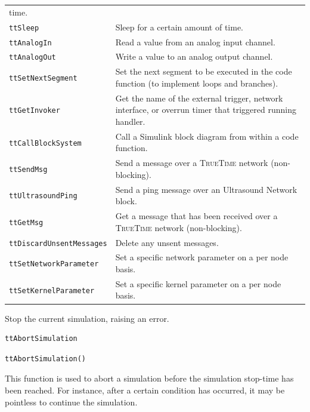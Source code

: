 \documentclass[final,twoside]{rapport}
\begin{document}
\begin{table}[htbp]
\begin{center}
\begin{tabularx}{\hsize}{|l|>{\raggedright\arraybackslash}X|}
time. \\
{\tt ttSleep} & Sleep for a certain amount of time. \\ 
{\tt ttAnalogIn} & Read a value from an analog input channel. \\
{\tt ttAnalogOut} & Write a value to an analog output channel. \\
{\tt ttSetNextSegment} & Set the next segment to be executed in the
code function (to implement loops and branches). \\
{\tt ttGetInvoker} & Get the name of the external trigger, network
interface, or overrun timer that triggered running handler.\\
{\tt ttCallBlockSystem} & Call a Simulink block diagram from within a
code function. \\
{\tt ttSendMsg} & Send a message over a \textsc{TrueTime} network (non-blocking). \\
{\tt ttUltrasoundPing} & Send a ping message over an Ultrasound Network block.\\
{\tt ttGetMsg} & Get a message that has been received over a \textsc{TrueTime}
network (non-blocking). \\ 
{\tt ttDiscardUnsentMessages} & Delete any unsent messages. \\
{\tt ttSetNetworkParameter} &  Set a specific network parameter on a per node basis.\\ 
{\tt ttSetKernelParameter} &  Set a specific kernel parameter on a
per node basis.\\ 

\hline
\end{tabularx}
\end{center}
\end{table}



\purpose
Stop the current simulation, raising an error.

\Msyntax
\begin{verbatim}
ttAbortSimulation
\end{verbatim}

\Csyntax
\begin{verbatim}
ttAbortSimulation()
\end{verbatim}

\descr This function is used to abort a simulation before the
simulation stop-time has been reached. For instance, after a certain
condition has occurred, it may be pointless to continue the
simulation.
\end{document}
